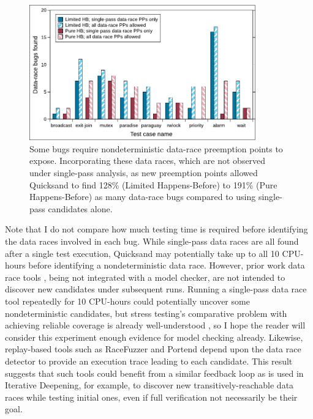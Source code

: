 \begin{figure}[t]
	\begin{center}
		\includegraphics[width=0.87\textwidth]{nondets.pdf}
	\end{center}
	\caption[Some bugs require nondeterministic data-race preemption points to expose.]
	{Some bugs require nondeterministic data-race preemption points to expose.
	Incorporating these data races,
	which are not observed under single-pass analysis,
	as new preemption points
	allowed Quicksand to find
	128\% (Limited Happens-Before) to 191\% (Pure Happens-Before) as many data-race bugs
	compared to using single-pass candidates alone.
	}
	\label{fig:dr-falsenegs}
\end{figure}

Note that I do not compare how much testing time is required before identifying the data races %
involved in each bug.
While single-pass data races are all found after a single test execution,
Quicksand may potentially take up to all 10 CPU-hours before identifying a nondeterministic data race.
However, prior work data race tools \cite{tsan,fasttrack},
being not integrated with a model checker,
are not intended to discover new candidates under subsequent runs.
Running a single-pass data race tool repeatedly for 10 CPU-hours could potentially uncover some nondeterministic candidates,
but stress testing's comparative problem with achieving reliable coverage is already well-understood
\cite{chess-icb,gambit},
so I hope the reader will consider this experiment enough evidence for model checking already.
Likewise, replay-based tools such as RaceFuzzer \cite{racefuzzer} and Portend \cite{portend}
depend upon the data race detector to provide an execution trace leading to each candidate.
This result suggests that
such tools could benefit from a similar feedback loop as is used in Iterative Deepening,
for example, to discover new transitively-reachable data races while testing initial ones,
even if full verification not necessarily be their goal.


